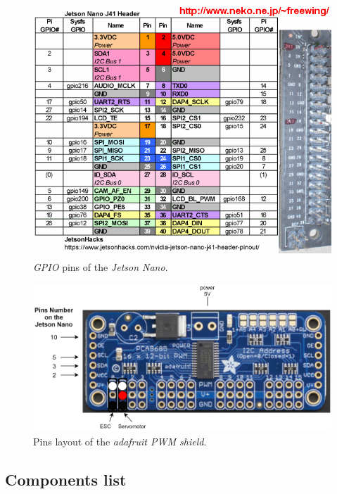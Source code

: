 		\begin{figure}[!htbp]
			\centering
			\includegraphics[width=0.6\columnwidth, height = 0.6\columnwidth]{imgs/nvidia_jetson_gpio.png}
			\caption{\textit{GPIO} pins of the \textit{Jetson Nano}.}
			\label{pinsnano}
		\end{figure}
		
		\FloatBarrier
		
		\FloatBarrier
		
		\begin{figure}[!htbp]
			\centering
			\includegraphics[width=1.0\columnwidth, height = 0.4\columnwidth]{imgs/plugging.png}
			\caption{Pins layout of the \textit{adafruit PWM shield}.}
			\label{ada}
		\end{figure}
		
		\FloatBarrier
		
		\subsection{Components list}
		
